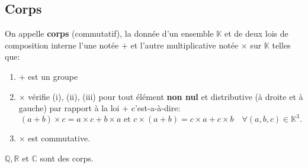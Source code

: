 \subsection{Corps}
\begin{madefinition}
	On appelle \textbf{corps} (commutatif), la donnée d'un ensemble $\mathbb{K}$ et de deux lois de composition interne l'une notée $+$ et l'autre multiplicative notée $\times$ sur $\mathbb{K}$ telles que:
	\begin{enumerate}
		\item $+$ est un groupe
		\item $\times $ vérifie (i), (ii), (iii) pour tout élément \textbf{non nul} et distributive (à droite et à gauche) par rapport à la loi $+$ c'est-a-à-dire:
		\[ (a+b)\times c = a \times c + b \times a \text{ et } c \times (a+b) = c \times a + c \times b \quad \forall (a,b,c) \in \mathbb{K}^3.\]
		\item $\times $ est commutative.
	\end{enumerate}
\end{madefinition}
\begin{monexemple}
	$\mathbb{Q}, \mathbb{R}$ et $\mathbb{C}$ sont des corps. 
\end{monexemple}
